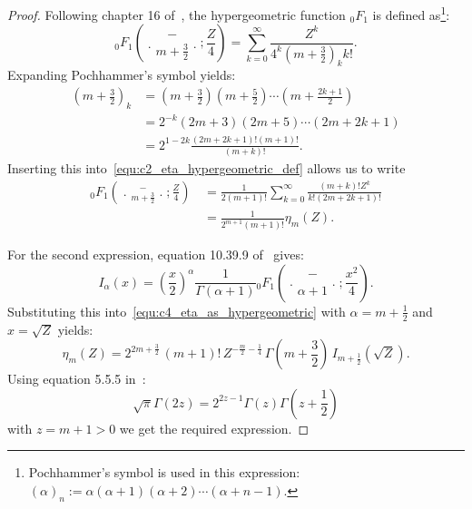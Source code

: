 \begin{proof}
    Following chapter 16 of~\cite{nist_dlmf}, the hypergeometric function ${}_0 F_1$ is defined as\footnote{Pochhammer's symbol is used in this expression: $( \alpha )_n := \alpha(\alpha + 1)(\alpha + 2)\cdots(\alpha + n - 1)$.}:
    \begin{equation}\label{equ:c2_eta_hypergeometric_def}
        {}_0 F_1\left(\genfrac..{0pt}{}{ - }{m+\frac{3}{2}}; \frac{Z}{4}\right) = \sum_{k=0}^{\infty} \frac{Z^k}{4^k\left(m+\frac{3}{2}\right)_k k!}\text{.}
    \end{equation}
    Expanding Pochhammer's symbol yields:
    \begin{align*}
        \left(m+\frac{3}{2}\right)_k & = \left(m+\frac{3}{2}\right)\left(m+\frac{5}{2}\right)\cdots\left(m+\frac{2k + 1}{2}\right) \\
                                     & = 2^{-k} \left(2m+3\right)\left(2m+5\right)\cdots\left(2m + 2k + 1\right)                   \\
                                     & = 2^{1 - 2k} \frac{(2m + 2k +1)!(m+1)!}{(m+k)!}\text{.}
    \end{align*}
    Inserting this into~\eqref{equ:c2_eta_hypergeometric_def} allows us to write
    \begin{align*}
        {}_0 F_1\left(\genfrac..{0pt}{}{ - }{m+\frac{3}{2}}; \frac{Z}{4}\right)\, & = \frac{1}{2(m+1)!}\sum_{k=0}^{\infty} \frac{(m+k)!Z^k}{k!(2m+2k+1)!} \\
                                                                                  & = \frac{1}{2^{m+1}(m+1)!}\eta_m(Z)\text{.}
    \end{align*}

    For the second expression, equation 10.39.9	of~\cite{nist_dlmf} gives:
    $$
        I_\alpha(x) = \left(\frac{x}{2}\right)^\alpha \frac{1}{\Gamma(\alpha + 1)} {}_0 F_1\left(\genfrac..{0pt}{}{ - }{\alpha + 1}; \frac{x^ 2}{4}\right)\text{.}
    $$
    Substituting this into~\eqref{equ:c4_eta_as_hypergeometric} with $\alpha = m+\frac{1}{2}$ and $x = \sqrt{Z}$ yields:
    $$
        \eta_m(Z) = 2^{2m+\frac{3}{2}} \, (m+1)! \, Z^{-\frac{m}{2} - \frac{1}{4}} \, \Gamma\left(m + \frac{3}{2}\right) \, I_{m+\frac{1}{2}}\left(\sqrt{Z}\right)\text{.}
    $$
    Using equation 5.5.5 in~\cite{nist_dlmf}:
    $$
        \sqrt{\pi} \Gamma(2z) = 2^{2z-1} \Gamma(z)\Gamma\left(z+\frac{1}{2}\right)
    $$
    with $z = m + 1 > 0$ we get the required expression.
\end{proof}

